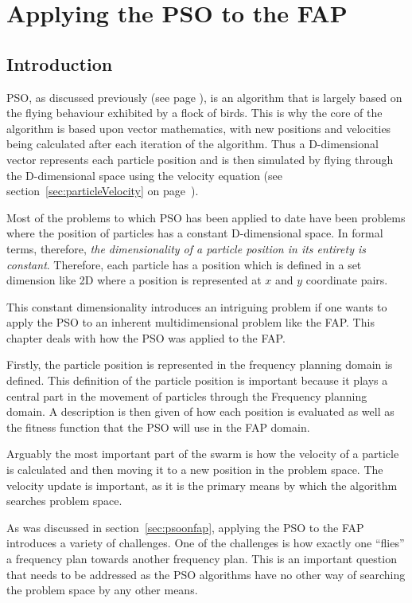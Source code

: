 \chapter{Applying the \gls{PSO} to the \gls{FAP}}
\label{chpt:psoapplicationFAP}
\section{Introduction}
PSO, as discussed previously (see page \pageref{sec:PSO}), is an algorithm that is largely based on the flying behaviour exhibited by a flock of birds. This is why the core of the algorithm is based upon vector mathematics, with new positions and velocities being calculated after each iteration of the algorithm. Thus a D-dimensional vector represents each particle position and is then simulated by flying through the D-dimensional space using the velocity equation (see section~\ref{sec:particleVelocity} on page~\pageref{eq:velocityupdate}).

Most of the problems to which \gls{PSO} has been applied to date have been problems where the position of particles has a constant D-dimensional space. In formal terms, therefore, \emph{the dimensionality of a particle position in its entirety is constant}. Therefore, each particle has a position which is defined in a set dimension like 2D where a position is represented at $x$ and $y$ coordinate pairs.

This constant dimensionality introduces an intriguing problem if one wants to apply the \gls{PSO} to an inherent multidimensional problem like the \gls{FAP}. This chapter deals with how the \gls{PSO} was applied to the \gls{FAP}.

Firstly, the particle position is represented in the frequency planning domain is defined. This definition of the particle position is important because it plays a central part in
the movement of particles through the Frequency planning domain. A description is then given of how each position is evaluated as well as the fitness function that the \gls{PSO} will use in the \gls{FAP} domain.

Arguably the most important part of the swarm is how the velocity of a particle is calculated and then moving it to a new position in the problem space. The velocity update is important, as it is the primary means by which the algorithm searches problem space.

As was discussed in section~\ref{sec:psoonfap}, applying the \gls{PSO} to the \gls{FAP} introduces a variety of challenges. One of the challenges is how exactly one ``flies'' a frequency plan towards another frequency plan. This is an important question that needs to be addressed as the \gls{PSO} algorithms have no other way of searching the problem space by any other means.

